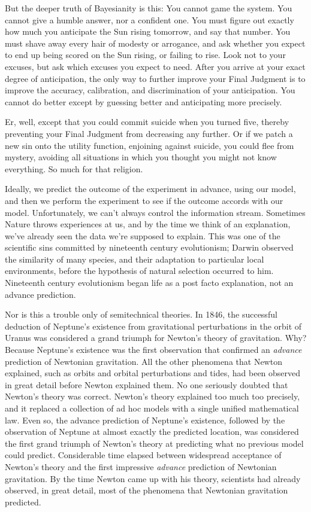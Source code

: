 {
 But the deeper truth of Bayesianity is this: You cannot game the
system. You cannot give a humble answer, nor a confident one. You must
figure out exactly how much you anticipate the Sun rising tomorrow, and
say that number. You must shave away every hair of modesty or
arrogance, and ask whether you expect to end up being scored on the Sun
rising, or failing to rise. Look not to your excuses, but ask which
excuses you expect to need. After you arrive at your exact degree of
anticipation, the only way to further improve your Final Judgment is to
improve the accuracy, calibration, and discrimination of your
anticipation. You cannot do better except by guessing better and
anticipating more precisely.}

{
 Er, well, except that you could commit suicide when you turned
five, thereby preventing your Final Judgment from decreasing any
further. Or if we patch a new sin onto the utility function, enjoining
against suicide, you could flee from mystery, avoiding all situations
in which you thought you might not know everything. So much for that
religion.}

\hr

{
 Ideally, we predict the outcome of the experiment in advance,
using our model, and then we perform the experiment to see if the
outcome accords with our model. Unfortunately, we can't
always control the information stream. Sometimes Nature throws
experiences at us, and by the time we think of an explanation,
we've already seen the data we're
supposed to explain. This was one of the scientific sins committed by
nineteenth century evolutionism; Darwin observed the similarity of many
species, and their adaptation to particular local environments, before
the hypothesis of natural selection occurred to him. Nineteenth century
evolutionism began life as a post facto explanation, not an advance
prediction.}

{
 Nor is this a trouble only of semitechnical theories. In 1846, the
successful deduction of Neptune's existence from
gravitational perturbations in the orbit of Uranus was considered a
grand triumph for Newton's theory of gravitation. Why?
Because Neptune's existence was the first observation
that confirmed an \textit{advance} prediction of Newtonian gravitation.
All the other phenomena that Newton explained, such as orbits and
orbital perturbations and tides, had been observed in great detail
before Newton explained them. No one seriously doubted that
Newton's theory was correct. Newton's
theory explained too much too precisely, and it replaced a collection
of ad hoc models with a single unified mathematical law. Even so, the
advance prediction of Neptune's existence, followed by
the observation of Neptune at almost exactly the predicted location,
was considered the first grand triumph of Newton's
theory at predicting what no previous model could predict. Considerable
time elapsed between widespread acceptance of Newton's
theory and the first impressive \textit{advance} prediction of
Newtonian gravitation. By the time Newton came up with his theory,
scientists had already observed, in great detail, most of the phenomena
that Newtonian gravitation predicted.}

